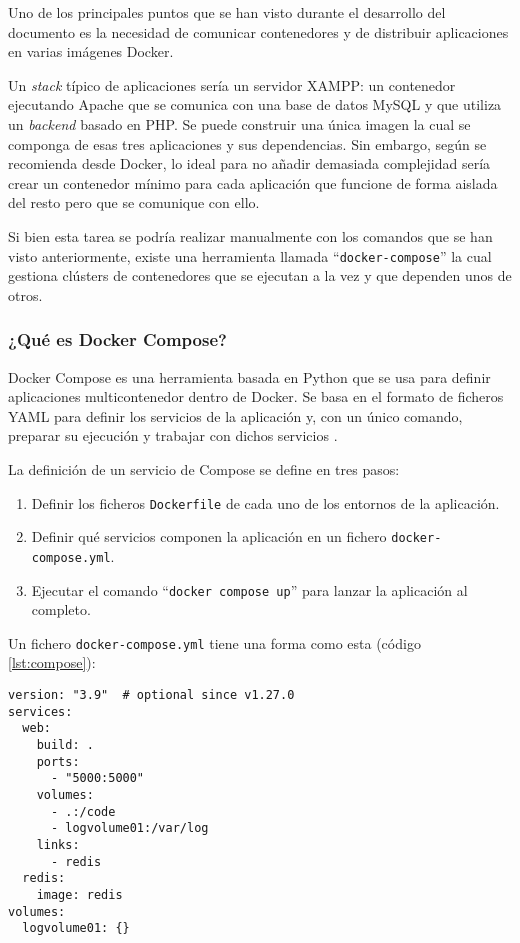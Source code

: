 Uno de los principales puntos que se han visto durante el desarrollo del documento
es la necesidad de comunicar contenedores y de distribuir aplicaciones en var­ias
imágenes Docker.

Un \textit{stack} típico de aplicaciones sería un servidor XAMPP: un contenedor
ejecutando Apache que se comunica con una base de datos MySQL y que utiliza
un \textit{backend} basado en PHP. Se puede construir una única imagen la cual
se componga de esas tres aplicaciones y sus dependencias. Sin embargo, según
se recomienda desde Docker, lo ideal para no añadir demasiada complejidad sería
crear un contenedor mínimo para cada aplicación que funcione de forma aislada del
resto pero que se comunique con ello.

Si bien esta tarea se podría realizar manualmente con los comandos que se
han visto anteriormente, existe una herramienta llamada ``\texttt{docker-compose}''
la cual gestiona clústers de contenedores que se ejecutan a la vez y que dependen
unos de otros.

\subsubsection*{¿Qué es Docker Compose?}
Docker Compose es una herramienta basada en Python que se usa para definir
aplicaciones multicontenedor dentro de Docker. Se basa en el formato de ficheros
YAML para definir los servicios de la aplicación y, con un único comando, 
preparar su ejecución y trabajar con dichos servicios \cite{OverviewDockerCompose2021}.

La definición de un servicio de Compose se define en tres pasos:

\begin{enumerate}
    \item Definir los ficheros \texttt{Dockerfile} de cada uno de los entornos de
          la aplicación.
    \item Definir qué servicios componen la aplicación en un fichero \texttt{docker-compose.yml}.
    \item Ejecutar el comando ``\lstinline[style=bash]!docker compose up!'' para lanzar
          la aplicación al completo.
\end{enumerate}

Un fichero \texttt{docker-compose.yml} tiene una forma como esta (código \ref{lst:compose}):

\begin{lstlisting}[style=docker-compose, caption={Estructura típica de un fichero de Docker Compose \cite{OverviewDockerCompose2021}.}, label={lst:compose}]
version: "3.9"  # optional since v1.27.0
services:
  web:
    build: .
    ports:
      - "5000:5000"
    volumes:
      - .:/code
      - logvolume01:/var/log
    links:
      - redis
  redis:
    image: redis
volumes:
  logvolume01: {}
\end{lstlisting}

